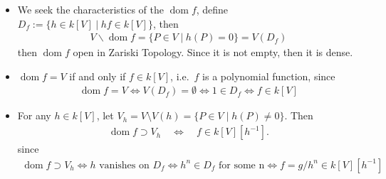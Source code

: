 \documentclass[8pt]{beamer}
\theoremstyle{definition}
\begin{document}
    \begin{frame}
        \begin{itemize}
            \item We seek the characteristics of the $\operatorname{dom} f$, define $D_f := \{ h \in k[V] \hspace{3pt} | \hspace{3pt} hf \in k[V] \} $, then
            \begin{align*}
                V \backslash \operatorname{dom} f = \{ P \in V \hspace{3pt} | \hspace{3pt} h(P) = 0 \} = V(D_f)
            \end{align*}
            then $\operatorname{dom} f $ open in Zariski Topology. Since it is not empty, then it is dense.
            \item $\operatorname{dom} f = V$ if and only if $f \in k[V]$, i.e.\ $f$ is a polynomial function, since 
            \begin{align*}
                \operatorname{dom} f = V \iff V(D_f) = \emptyset \iff 1 \in D_f \iff f \in k[V] 
            \end{align*}
            \item For any $h \in k[V]$, let $V_h = V \setminus V(h) = \{ P \in V \mid h(P) \neq 0\}$. Then
            \begin{align*}
                \operatorname{dom} f \supset V_h \quad\Longleftrightarrow\quad f \in k[V][h^{-1}].
            \end{align*}
            since 
            \begin{align*}
                \operatorname{dom} f \supset V_h \iff h \text{ vanishes on } D_f \iff h^n \in D_f \text{ for some n} \iff f = g/h^n \in k[V][h^{-1}]
            \end{align*}
        \end{itemize}
        
    \end{frame}
\end{document}
